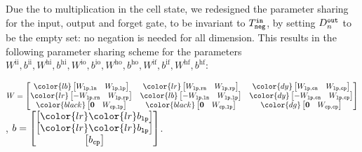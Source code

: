 \documentclass{article}
\begin{document}
Due the to multiplication in the cell state, we redesigned the parameter sharing for the input, output and forget gate, to be invariant to $T^{\tt in}_{\tt neg}$, by setting $D_{n}^{\tt out}$  to be the empty set: no negation is needed for all dimension. This results in the following parameter sharing scheme for the parameters $W^\text{ii}, b^\text{ii}, W^\text{hi}, b^\text{hi}, W^\text{io}, b^\text{io}, W^\text{ho}, b^\text{ho}, W^\text{if}, b^\text{if}, W^\text{hf}, b^\text{hf}$:
\begin{center}
$
W = \begin{bmatrix}
{\color{lb}
\begin{bmatrix}
W_{\tt lp, ln} & W_{\tt lp, lp}\\
\end{bmatrix}
} 
& 
{\color{lr}
\begin{bmatrix}
W_{\tt lp,rn} & W_{\tt lp, rp}\\
\end{bmatrix}
}
&
{\color{dy}
\begin{bmatrix}
W_{\tt lp, cn} & W_{\tt lp, cp}\\
\end{bmatrix}
}\\
{\color{lr}
\begin{bmatrix}
-W_{\tt lp,rn} & W_{\tt lp, rp}\\
\end{bmatrix}
}
& 
{\color{lb}
\begin{bmatrix}
-W_{\tt lp, ln} & W_{\tt lp, lp}\\
\end{bmatrix}
} 
&
{\color{dy}
\begin{bmatrix}
-W_{\tt lp, cn} & W_{\tt lp, cp}\\
\end{bmatrix}
}\\
{\color{black}
\begin{bmatrix}
\bf 0 & W_{\tt cp, lp}\\
\end{bmatrix}
} 
& 
{\color{black}
\begin{bmatrix}
\bf 0 & W_{\tt cp, lp}\\
\end{bmatrix}
}
&
{\color{dg}
\begin{bmatrix}
\bf 0 & W_{\tt cp, cp}\\
\end{bmatrix}
}\\
\end{bmatrix}
$,
$b = \begin{bmatrix}
\begin{bmatrix}
\color{lr}
\color{lr}
b_{\tt lp}
\end{bmatrix} \\ 
\begin{bmatrix}
\color{lr}
\color{lr}
b_{\tt lp} 
\end{bmatrix} \\ 
\begin{bmatrix}
b_{\tt cp}\end{bmatrix}\\
\end{bmatrix}
$.
\end{center}
\end{document}
